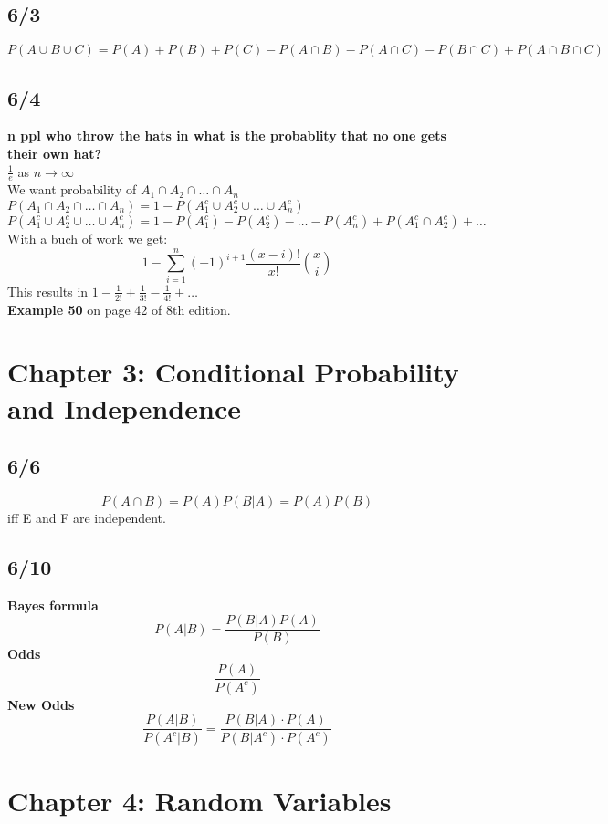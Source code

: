\documentclass{article}
\begin{document}
\subsection*{6/3}
$P(A \cup B \cup C) = P(A) + P(B) + P(C) - P(A \cap B) - P(A \cap C) - P(B \cap C) + P(A \cap B \cap C)$\\

\subsection*{6/4}
\textbf{n ppl who throw the hats in what is the probablity that no one gets their own hat?}\\
$\frac{1}{e}$ as $n \to \infty$\\
We want probability of $A_1 \cap A_2 \cap \ldots \cap A_n$\\
$P(A_1 \cap A_2 \cap \ldots \cap A_n) = 1 - P(A_1^c \cup A_2^c \cup \ldots \cup A_n^c)$\\
$P(A_1^c \cup A_2^c \cup \ldots \cup A_n^c) = 1 - P(A_1^c) - P(A_2^c) - \ldots - P(A_n^c) + P(A_1^c \cap A_2^c) + \ldots$\\
With a buch of work we get:
$$ 1 - \sum_{i=1}^{n} (-1)^{i+1} \frac{(x-i)!}{x!}\binom{x}{i}$$
This results in $1 - \frac{1}{2!} + \frac{1}{3!} - \frac{1}{4!} + \ldots$\\

\textbf{Example 50} on page 42 of 8th edition.\\

\section{Chapter 3: Conditional Probability and Independence}
\subsection*{6/6}
$$P(A \cap B) = P(A)P(B|A) = P(A)P(B)$$
iff E and F are independent.\\
\subsection*{6/10}
\textbf{Bayes formula}\\
$$P(A|B) = \frac{P(B|A)P(A)}{P(B)}$$
\textbf{Odds}\\
$$\frac{P(A)}{P(A^c)}$$
\textbf{New Odds}\\
$$\frac{P(A|B)}{P(A^c|B)} = \frac{P(B|A) \cdot P(A)}{P(B|A^c) \cdot P(A^c) }$$
\section{Chapter 4: Random Variables}
\end{document}
